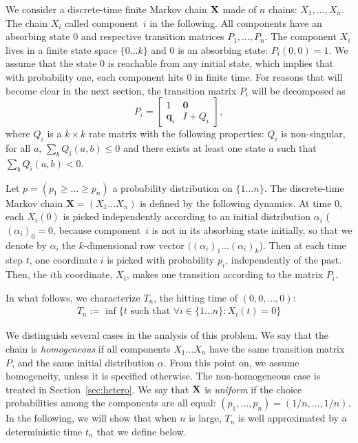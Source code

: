 \documentclass{aptpub}
\newcommand\bX{\mathbf{X}}
\begin{document}
We consider a discrete-time finite Markov chain $\bf X$ made of $n$
chains: $X_1,\ldots, X_n$. The chain $X_i$ called component~$i$ in the
following. All components have an absorbing state $0$ and respective
transition matrices $P_1, \ldots, P_n$.  The component $X_i$ lives in
a finite state space $\{0\dots k\}$ and $0$ is an absorbing state:
$P_i(0,0)=1$.  We assume that the state $0$ is reachable from any
initial state, which implies that with probability one, each component
hits $0$ in finite time.  For reasons that will become clear in the
next section, the transition matrix $P_i$ will be decomposed as
\begin{equation}
  P_i = \left[
    \begin{array}{cc}
      1&\mathbf{0}\\
      \mathbf{q}_i & I+Q_i
    \end{array}
  \right],
\label{eq:defQ}
\end{equation}
where $Q_i$ is a $k\times k$ rate matrix with the following
properties: $Q_i$ is non-singular, for all $a$, $\sum_{b}Q_i(a,b)\le0$
and there exists at least one state $a$ such that
$\sum_{b} Q_i(a,b) < 0$.

Let $p=(p_1\geq \dots \geq p_n)$ a probability distribution on
$\{1\dots n\}$. The discrete-time Markov chain $\bX=(X_1\dots X_n)$ is
defined by the following dynamics. At time $0$, each $X_i(0)$ is
picked independently according to an initial distribution $\alpha_i$
($(\alpha_i)_0 = 0$, because  component~$i$ is not in its  absorbing state initially, so that we denote by $\alpha_i$ the $k$-dimensional row vector
$((\alpha_i)_1\dots (\alpha_i)_k$).  Then at each time step $t$, one
coordinate $i$ is picked with probability $p_i$, independently of the
past. Then, the $i$th coordinate, $X_i$, makes one transition
according to the matrix $P_i$.

In what follows, we characterize $T_n$, the hitting time of
$(0,0,\dots,0)$:
\begin{align*}
  T_n:=\inf \{t \text{ such that }\forall i\in\{1\dots n\}:
        X_i(t)=0\}
\end{align*}


We distinguish several cases in the analysis of this problem.  We say
that the chain is {\it homogeneous} if all components $X_1\dots X_n$
have the same transition matrix $P$, and the same initial distribution
$\alpha$.  From this point on, we assume homogeneity, unless it is
specified otherwise.  The non-homogeneous case is treated in
Section~\ref{sec:hetero}.  We say that $\bf X$ is {\it uniform} if the
choice probabilities among the components are all equal:
$(p_1,\dots,p_n) = (1/n,\ldots, 1/n)$.
In the following, we will show that when $n$ is large, $T_n$ is well
approximated by a deterministic time $t_n$ that we define below. 
\end{document}
